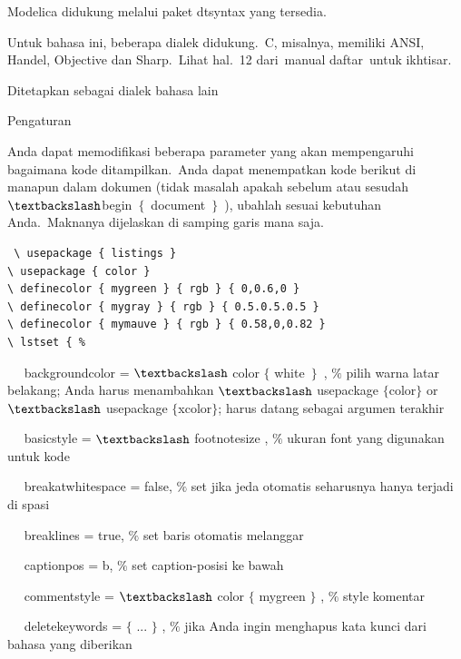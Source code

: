 Modelica didukung melalui paket dtsyntax yang tersedia.\par

Untuk bahasa ini, beberapa dialek didukung. C, misalnya, memiliki ANSI, Handel, Objective dan Sharp. Lihat hal. 12 dari manual daftar untuk ikhtisar.\par

Ditetapkan sebagai dialek bahasa lain\par

Pengaturan \par

Anda dapat memodifikasi beberapa parameter yang akan mempengaruhi bagaimana kode ditampilkan. Anda dapat menempatkan kode berikut di manapun dalam dokumen (tidak masalah apakah sebelum atau sesudah $\textbackslash$begin $ \{ $ document $ \} $ ), ubahlah sesuai kebutuhan Anda. Maknanya dijelaskan di samping garis mana saja.\par
\begin{verbatim}
 \ usepackage { listings }
\ usepackage { color }
\ definecolor { mygreen } { rgb } { 0,0.6,0 }
\ definecolor { mygray } { rgb } { 0.5.0.5.0.5 }
\ definecolor { mymauve } { rgb } { 0.58,0,0.82 }
\ lstset { %

\end{verbatim}


~~ backgroundcolor = $\textbackslash$ color $ \{ $ white~$ \} $~, $\%$ pilih warna latar belakang;  Anda harus menambahkan $\textbackslash$ usepackage $ \{ $color$ \} $ or $\textbackslash$ usepackage $ \{ $xcolor$ \} $;  harus datang sebagai argumen terakhir\par

~~ basicstyle = $\textbackslash$ footnotesize , $\%$ ukuran font yang digunakan untuk kode\par

~~ breakatwhitespace = false, $\%$ set jika jeda otomatis seharusnya hanya terjadi di spasi\par

~~ breaklines = true, $\%$ set baris otomatis melanggar\par

~~ captionpos = b, $\%$ set caption-posisi ke bawah\par

~~ commentstyle = $\textbackslash$ color $ \{ $ mygreen $ \} $ , $\%$ style komentar\par

~~ deletekeywords = $ \{ $ ... $ \} $ , $\%$ jika Anda ingin menghapus kata kunci dari bahasa yang diberikan\par

